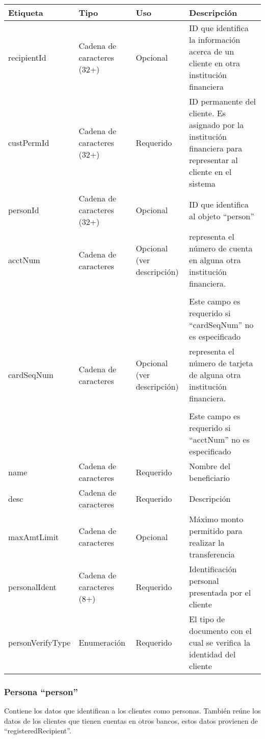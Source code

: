 \begin{center}
\begin{longtable}{|>{\centering\arraybackslash}p{}|>{\centering\arraybackslash}p{}|>{\centering\arraybackslash}p{}|>{\centering\arraybackslash}p{}|}
\hline 
\bfseries {Etiqueta} & \bfseries {Tipo} & \bfseries {Uso} & \bfseries {Descripción} \\ 
\hline 
recipientId & Cadena de caracteres (32+) & Opcional & ID que identifica la información acerca de un cliente en otra institución financiera \\ 
\hline 
custPermId & Cadena de caracteres (32+) & Requerido & ID permanente del cliente. Es asignado por la institución financiera para representar al cliente en el sistema \\
\hline 
personId & Cadena de caracteres (32+) & Opcional & ID que identifica al objeto ``person'' \\ 
\hline 
acctNum & Cadena de caracteres & Opcional (ver descripción) & representa el número de cuenta en alguna otra institución financiera. 
\\ & & & \\
& & & Este campo es requerido si ``cardSeqNum'' no es especificado \\ 
\hline
cardSeqNum & Cadena de caracteres & Opcional (ver descripción) & representa el número de tarjeta de alguna otra institución financiera. 
\\ & & & \\
& & & Este campo es requerido si ``acctNum'' no es especificado \\ 
\hline
name & Cadena de caracteres & Requerido & Nombre del beneficiario \\ 
\hline
desc & Cadena de caracteres & Requerido & Descripción \\ 
\hline
maxAmtLimit & Cadena de caracteres & Opcional & Máximo monto permitido para realizar la transferencia \\ 
\hline
personalIdent & Cadena de caracteres (8+) & Requerido & Identificación personal presentada por el cliente \\ 
\hline
personVerifyType & Enumeración & Requerido & El tipo de documento con el cual se verifica la identidad del cliente \\ 
\hline
\end{longtable}
\end{center}

\subsubsection{Persona ``person''}
Contiene los datos que identifican a los clientes como personas. También reúne los
datos de los clientes que tienen cuentas en otros bancos, estos datos provienen de
``registeredRecipient''.

